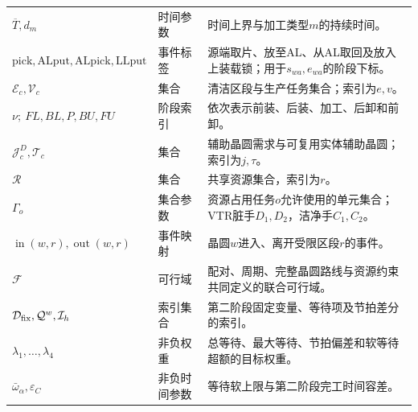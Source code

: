 \documentclass[final,5p,times,twocolumn]{elsarticle}
\begin{document}
\begin{table}[t]
\begin{tabular}{C{0.20\textwidth}C{0.16\textwidth}C{0.43\textwidth}}
$\overline T,d_m$ & 时间参数 & 时间上界与加工类型$m$的持续时间。\\
$\mathrm{pick,ALput,ALpick,LLput}$ & 事件标签 & 源端取片、放至AL、从AL取回及放入上装载锁；用于$s_{wa},e_{wa}$的阶段下标。\\
$\mathcal E_c,\mathcal V_c$ & 集合 & 清洁区段与生产任务集合；索引为$e,v$。\\
$\nu;\ FL,BL,P,BU,FU$ & 阶段索引 & 依次表示前装、后装、加工、后卸和前卸。\\
$\mathcal J_c^D,\mathcal T_c$ & 集合 & 辅助晶圆需求与可复用实体辅助晶圆；索引为$j,\tau$。\\
$\mathcal R$ & 集合 & 共享资源集合，索引为$r$。\\
$\Gamma_o$ & 集合参数 & 资源占用任务$o$允许使用的单元集合；VTR脏手$D_1,D_2$，洁净手$C_1,C_2$。\\
$\operatorname{in}(w,r),\operatorname{out}(w,r)$ & 事件映射 & 晶圆$w$进入、离开受限区段$r$的事件。\\
$\mathcal F$ & 可行域 & 配对、周期、完整晶圆路线与资源约束共同定义的联合可行域。\\
$\mathcal D_{\rm fix},\mathcal Q^w,\mathcal I_h$ & 索引集合 & 第二阶段固定变量、等待项及节拍差分的索引。\\
$\lambda_1,\ldots,\lambda_4$ & 非负权重 & 总等待、最大等待、节拍偏差和软等待超额的目标权重。\\
$\bar\omega_\alpha,\varepsilon_C$ & 非负时间参数 & 等待软上限与第二阶段完工时间容差。\\
\bottomrule
\end{tabular}
\end{table}
\end{document}
